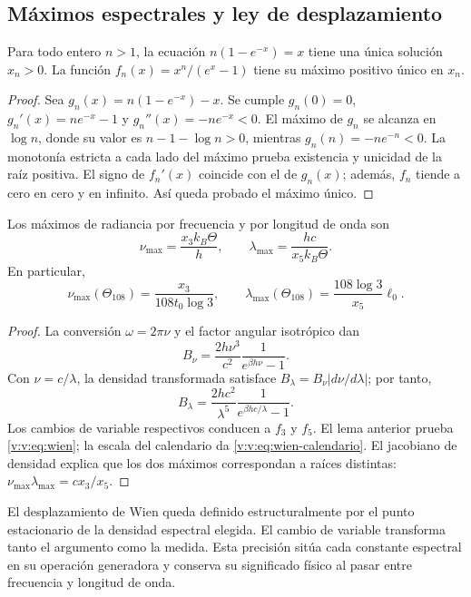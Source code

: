 \newpage
\subsection{Máximos espectrales y ley de desplazamiento}

\begin{lemma}
\label{v:v:lem:raiz-wien}
Para todo entero \(n>1\), la ecuación
\(n(1-e^{-x})=x\) tiene una única solución \(x_n>0\).
La función \(f_n(x)=x^n/(e^x-1)\) tiene su máximo positivo único en
\(x_n\).
\end{lemma}
\begin{proof}
Sea \(g_n(x)=n(1-e^{-x})-x\). Se cumple
\(g_n(0)=0\), \(g_n'(x)=ne^{-x}-1\) y
\(g_n''(x)=-ne^{-x}<0\). El máximo de \(g_n\) se alcanza en
\(\log n\), donde su valor es \(n-1-\log n>0\), mientras
\(g_n(n)=-ne^{-n}<0\). La monotonía estricta a cada lado del máximo
prueba existencia y unicidad de la raíz positiva. El signo de
\(f_n'(x)\) coincide con el de \(g_n(x)\); además, \(f_n\) tiende
a cero en cero y en infinito. Así queda probado el máximo único.
\end{proof}

\begin{proposition}
\label{v:v:prop:wien}
Los máximos de radiancia por frecuencia y por longitud de onda son
\begin{equation}
 \nu_{\max}=\frac{x_3 k_B\Theta}{h},\qquad
 \lambda_{\max}=\frac{hc}{x_5 k_B\Theta}.
 \label{v:v:eq:wien}
\end{equation}
En particular,
\begin{equation}
 \nu_{\max}(\Theta_{108})=
 \frac{x_3}{108t_0\log3},\qquad
 \lambda_{\max}(\Theta_{108})=
 \frac{108\log3}{x_5}\ell_0.
 \label{v:v:eq:wien-calendario}
\end{equation}
\end{proposition}
\begin{proof}
La conversión \(\omega=2\pi\nu\) y el factor angular isotrópico dan
\[
 B_\nu=\frac{2h\nu^3}{c^2}\frac1{e^{\beta h\nu}-1}.
\]
Con \(\nu=c/\lambda\), la densidad transformada satisface
\(B_\lambda=B_\nu|d\nu/d\lambda|\); por tanto,
\[
 B_\lambda=\frac{2hc^2}{\lambda^5}
 \frac1{e^{\beta hc/\lambda}-1}.
\]
Los cambios de variable respectivos conducen a \(f_3\) y \(f_5\).
El lema anterior prueba \eqref{v:v:eq:wien}; la escala del calendario
da \eqref{v:v:eq:wien-calendario}. El jacobiano de densidad explica que
los dos máximos correspondan a raíces distintas:
\(\nu_{\max}\lambda_{\max}=c x_3/x_5\).
\end{proof}

El desplazamiento de Wien queda definido estructuralmente por el punto
estacionario de la densidad espectral elegida. El cambio de variable
transforma tanto el argumento como la medida. Esta precisión sitúa
cada constante espectral en su operación generadora y conserva su
significado físico al pasar entre frecuencia y longitud de onda.
